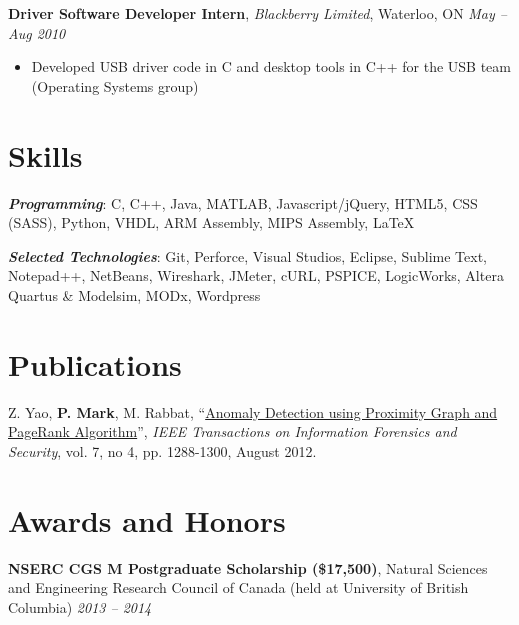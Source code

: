 \documentclass[letterpaper]{article}
\newcommand{\jobtitle}[4]{
  \textbf{#1}, \emph{#2}, {#3} \hfill \emph{#4}\\
}
\newenvironment{jobdescription}{
  \vspace{-4pt}
  \begin{itemize}
  \setlength{\itemsep}{2pt}
  \setlength{\parskip}{0pt}
  \setlength{\parsep}{0pt}
}{\end{itemize}}
\newcommand{\itemdescription}[3]{
  \textbf{#1}, {#2} \hfill \emph{#3}\\
  \medskip
}
\begin{document}
\jobtitle{Driver Software Developer Intern}{Blackberry
Limited}{Waterloo, ON}{May -- Aug 2010} 
\begin{jobdescription}
  \item Developed USB driver code in C and desktop tools in C++ for the USB
  team (Operating Systems group)
\end{jobdescription}


\medskip

\section*{Skills}
\emph{\textbf{Programming}}: C, C++, Java, MATLAB, Javascript/jQuery,
HTML5, CSS (SASS), Python, VHDL, ARM Assembly, MIPS Assembly, \LaTeX\\
\medskip

\emph{\textbf{Selected Technologies}}: Git, Perforce, Visual Studios, Eclipse,
Sublime Text, Notepad++, NetBeans, Wireshark, JMeter, cURL, PSPICE, LogicWorks,
Altera Quartus \& Modelsim, MODx, Wordpress\\
\bigskip

\hypertarget{sec:publications}{}
\section*{Publications}
Z. Yao, \textbf{P. Mark}, M. Rabbat, 
``\href{http://ieeexplore.ieee.org/xpl/articleDetails.jsp?arnumber=6175122}
{Anomaly Detection using Proximity Graph and PageRank Algorithm}'', \emph{IEEE 
Transactions on Information Forensics and Security}, vol. 7, no 4, pp. 
1288-1300, August 2012.
\bigskip

\section*{Awards and Honors}
\itemdescription{NSERC CGS M Postgraduate Scholarship (\$17,500)}{Natural 
Sciences and Engineering Research Council of Canada (held at University of
British Columbia)}{2013 -- 2014}
\end{document}
